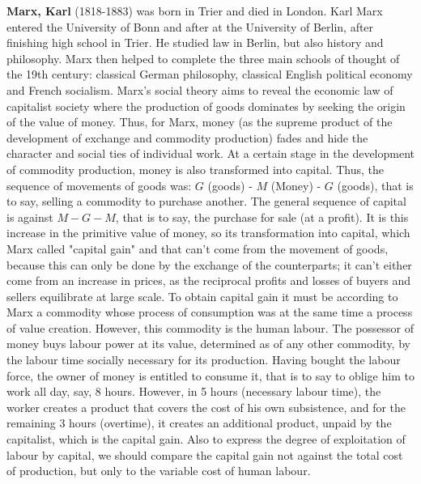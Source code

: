 \textbf{Marx, Karl} (1818-1883) was born in Trier and died in London. Karl Marx entered the University of Bonn and after at the University of Berlin, after finishing high school in Trier. He studied law in Berlin, but also  history and philosophy. Marx then helped to complete the three main schools of thought of the 19th century: classical German philosophy, classical English political economy and French socialism. Marx's social theory aims to reveal the economic law of capitalist society where the production of goods dominates by seeking the origin of the value of money. Thus, for Marx, money (as the supreme product of the development of exchange and commodity production) fades and hide the character and social ties of individual work. At a certain stage in the development of commodity production, money is also transformed into capital. Thus, the sequence of movements of goods was: $G$ (goods) - $M$ (Money) - $G$ (goods), that is to say, selling a commodity to purchase another. The general sequence of capital is against $M-G-M$, that is to say, the purchase for sale (at a profit). It is this increase in the primitive value of money, so its transformation into capital, which Marx called "capital gain" and that can't come from the movement of goods, because this can only be done by the exchange of the counterparts; it can't either come from an increase in prices, as the reciprocal profits and losses of buyers and sellers equilibrate at large scale. To obtain capital gain it must be according to Marx a commodity whose process of consumption was at the same time a process of value creation. However, this commodity is the human labour. The possessor of money buys labour power at its value, determined as of any other commodity, by the labour time socially necessary for its production. Having bought the labour force, the owner of money is entitled to consume it, that is to say to oblige him to work all day, say, 8 hours. However, in 5 hours (necessary labour time), the worker creates a product that covers the cost of his own subsistence, and for the remaining 3 hours (overtime), it creates an additional product, unpaid by the capitalist, which is the capital gain. Also to express the degree of exploitation of labour by capital, we should compare the capital gain not against the total cost of production, but only to the variable cost of human labour.

